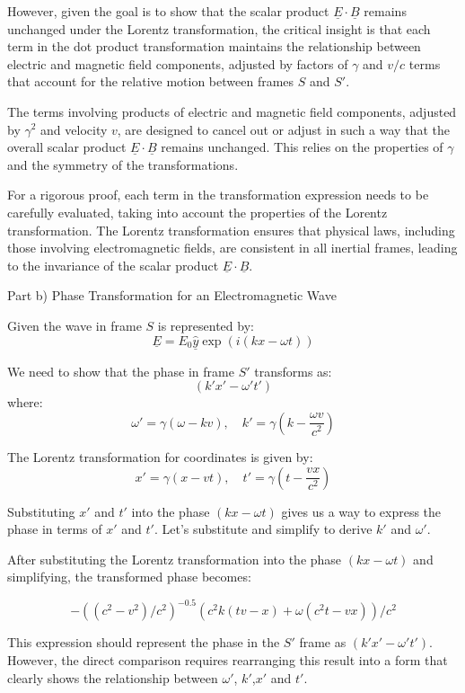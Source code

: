 \documentclass[a4paper,11pt]{article}
\begin{document}
However, given the goal is to show that the scalar product \(\underline{E} \cdot \underline{B}\) remains unchanged under the Lorentz transformation, the critical insight is that each term in the dot product transformation maintains the relationship between electric and magnetic field components, adjusted by factors of \(\gamma\) and \(v/c\) terms that account for the relative motion between frames \(S\) and \(S'\).

The terms involving products of electric and magnetic field components, adjusted by \(\gamma^2\) and velocity \(v\), are designed to cancel out or adjust in such a way that the overall scalar product \(\underline{E} \cdot \underline{B}\) remains unchanged. This relies on the properties of \(\gamma\) and the symmetry of the transformations.

For a rigorous proof, each term in the transformation expression needs to be carefully evaluated, taking into account the properties of the Lorentz transformation. The Lorentz transformation ensures that physical laws, including those involving electromagnetic fields, are consistent in all inertial frames, leading to the invariance of the scalar product \(\underline{E} \cdot \underline{B}\).

Part b) Phase Transformation for an Electromagnetic Wave

Given the wave in frame \( S \) is represented by:
\[ \underline{E} = E_{0} \hat{\underline{y}} \exp(i(kx - \omega t)) \]

We need to show that the phase in frame \( S' \) transforms as:
\[ (k'x' - \omega' t') \]
where:
\[ \omega' = \gamma(\omega - kv), \quad k' = \gamma(k - \frac{\omega v}{c^{2}}) \]

The Lorentz transformation for coordinates is given by:
\[ x' = \gamma(x - vt), \quad t' = \gamma(t - \frac{vx}{c^{2}}) \]

Substituting \( x' \) and \( t' \) into the phase \( (kx - \omega t) \) gives us a way to express the phase in terms of \( x' \) and \( t' \). Let's substitute and simplify to derive \( k' \) and \( \omega' \).

After substituting the Lorentz transformation into the phase \( (kx - \omega t) \) and simplifying, the transformed phase becomes:

\[
- ((c^2-v^2)/c^2)^{-0.5}(c^2k(tv-x)+\omega (c^2t -vx))/c^2
\]

This expression should represent the phase in the \(S'\) frame as \( (k'x' - \omega' t') \). However, the direct comparison requires rearranging this result into a form that clearly shows the relationship between \(\omega'\), \(k'\),\(x'\) and \(t'\).
\end{document}
